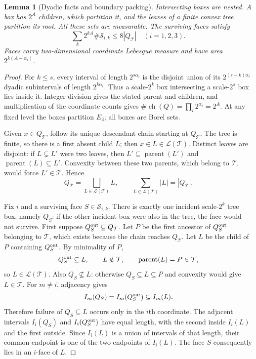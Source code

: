 \documentclass[12pt,reqno]{amsart}
\theoremstyle{plain}
\newtheorem{lemma}[theorem]{Lemma}
\theoremstyle{definition}
\theoremstyle{remark}
\numberwithin{equation}{section}
\newcommand{\T}{\mathcal T}
\DeclareMathOperator{\ch}{ch}
\begin{document}
\begin{lemma}[Dyadic facts and boundary packing]\label{lem:geometry}
Intersecting boxes are nested. A box has $2^A$ children, which
partition it, and the leaves of a finite convex tree partition its root.
All these sets are measurable. The surviving faces satisfy
\begin{equation}\label{eq:packing}
 \sum_k2^{kA}\#\mathscr S_{i,k}\le8|Q_\T|\quad(i=1,2,3).
\end{equation}
Faces carry two-dimensional coordinate Lebesgue measure and have area
$2^{k(A-\alpha_i)}$.
\end{lemma}
\begin{proof}
For $k\le s$, every interval of length $2^{s\alpha_i}$ is the
disjoint union of its $2^{(s-k)\alpha_i}$ dyadic subintervals of
length $2^{k\alpha_i}$. Thus a scale-$2^k$ box intersecting a
scale-$2^s$ box lies inside it. Integer division gives the stated
parent and children, and multiplication of the coordinate counts gives
$\#\ch(Q)=\prod_i2^{\alpha_i}=2^A$. At any fixed level the boxes
partition $E_3$; all boxes are Borel sets.

Given $x\in Q_\T$, follow its unique descendant chain starting at
$Q_\T$. The tree is finite, so there is a first absent child $L$;
then $x\in L\in\mathcal L(\T)$. Distinct leaves are disjoint:
if $L\subsetneq L'$ were two leaves, then
$L'\subseteq\operatorname{parent}(L')$ and
$\operatorname{parent}(L)\subseteq L'$. Convexity between these
two parents, which belong to $\T$, would force $L'\in\T$.
Hence
\begin{equation}\label{eq:leaf_partition}
 Q_\T=\bigsqcup_{L\in\mathcal L(\T)}L,\qquad
 \sum_{L\in\mathcal L(\T)}|L|=|Q_\T|.
\end{equation}

Fix $i$ and a surviving face $S\in\mathscr S_{i,k}$. There is
exactly one incident scale-$2^k$ tree box, namely $Q_S$: if the
other incident box were also in the tree, the face would not survive.
First suppose $Q_S^{\rm out}\subseteq Q_\T$. Let $P$ be the first
ancestor of $Q_S^{\rm out}$ belonging to $\T$, which exists because
the chain reaches $Q_\T$. Let $L$ be the child of $P$ containing
$Q_S^{\rm out}$. By minimality of $P$,
\[
 Q_S^{\rm out}\subseteq L,\qquad L\notin\T,\qquad
 \operatorname{parent}(L)=P\in\T,
\]
so $L\in\mathcal L(\T)$. Also $Q_S\not\subseteq L$: otherwise
$Q_S\subseteq L\subseteq P$ and convexity would give $L\in\T$.
For $m\ne i$, adjacency gives
\[
 I_m(Q_S)=I_m(Q_S^{\rm out})\subseteq I_m(L).
\]
Therefore failure of $Q_S\subseteq L$ occurs only in the $i$th
coordinate. The adjacent intervals $I_i(Q_S)$ and
$I_i(Q_S^{\rm out})$ have equal length, with the second inside
$I_i(L)$ and the first outside. Since $I_i(L)$ is a union of
intervals of that length, their common endpoint is one of the two
endpoints of $I_i(L)$. The face $S$ consequently lies in an
$i$-face of $L$.


\end{proof}
\end{document}
